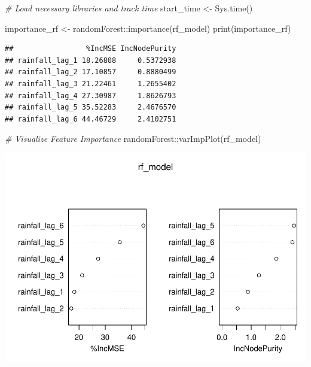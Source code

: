 \documentclass[
]{article}
\newenvironment{Shaded}{}{}
\newcommand{\CommentTok}[1]{\textcolor[rgb]{0.38,0.63,0.69}{\textit{#1}}}
\newcommand{\FunctionTok}[1]{\textcolor[rgb]{0.02,0.16,0.49}{#1}}
\newcommand{\NormalTok}[1]{#1}
\newcommand{\OtherTok}[1]{\textcolor[rgb]{0.00,0.44,0.13}{#1}}
\newcommand{\SpecialCharTok}[1]{\textcolor[rgb]{0.25,0.44,0.63}{#1}}
\begin{document}
\begin{Shaded}
\begin{Highlighting}[]
\CommentTok{\# Load necessary libraries and track time}
\NormalTok{start\_time }\OtherTok{\textless{}{-}} \FunctionTok{Sys.time}\NormalTok{()}

\NormalTok{importance\_rf }\OtherTok{\textless{}{-}}\NormalTok{ randomForest}\SpecialCharTok{::}\FunctionTok{importance}\NormalTok{(rf\_model)}
\FunctionTok{print}\NormalTok{(importance\_rf)}
\end{Highlighting}
\end{Shaded}

\begin{verbatim}
##                 %IncMSE IncNodePurity
## rainfall_lag_1 18.26808     0.5372938
## rainfall_lag_2 17.10857     0.8880499
## rainfall_lag_3 21.22461     1.2655402
## rainfall_lag_4 27.30987     1.8626793
## rainfall_lag_5 35.52283     2.4676570
## rainfall_lag_6 44.46729     2.4102751
\end{verbatim}

\begin{Shaded}
\begin{Highlighting}[]
\CommentTok{\# Visualize Feature Importance}
\NormalTok{randomForest}\SpecialCharTok{::}\FunctionTok{varImpPlot}\NormalTok{(rf\_model)}
\end{Highlighting}
\end{Shaded}

\begin{center}\includegraphics{BI_VegetationResponse_Project_HarvardX_Ph125_9x_files/figure-latex/re_model_intrepret-1} \end{center}
\end{document}
